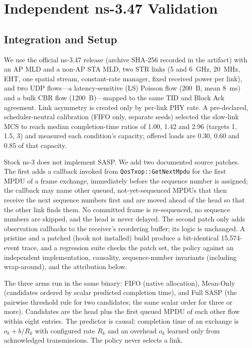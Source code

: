 \documentclass[10pt,journal,compsoc]{IEEEtran}
\begin{document}
\section{Independent ns-3.47 Validation}
\label{sec:ns3}

\subsection{Integration and Setup}
We use the official ns-3.47 release (archive SHA-256 recorded in the artifact) with an AP MLD and a non-AP STA MLD, two STR links (5 and 6~GHz, 20~MHz, EHT, one spatial stream, constant-rate manager, fixed received power per link), and two UDP flows---a latency-sensitive (LS) Poisson flow (200~B, mean 8~ms) and a bulk CBR flow (1200~B)---mapped to the same TID and Block Ack agreement. Link asymmetry is created only by per-link PHY rate. A pre-declared, scheduler-neutral calibration (FIFO only, separate seeds) selected the slow-link MCS to reach median completion-time ratios of 1.00, 1.42 and 2.96 (targets 1, 1.5, 3) and measured each condition's capacity; offered loads are 0.30, 0.60 and 0.85 of that capacity.

Stock ns-3 does not implement SASP. We add two documented source patches. The first adds a callback invoked from \texttt{QosTxop::GetNextMpdu} for the first MPDU of a frame exchange, immediately before the sequence number is assigned; the callback may name other queued, not-yet-sequenced MPDUs that then receive the next sequence numbers first and are moved ahead of the head so that the other link finds them. No committed frame is re-sequenced, no sequence numbers are skipped, and the head is never delayed. The second patch only adds observation callbacks to the receiver's reordering buffer; its logic is unchanged. A pristine and a patched (hook not installed) build produce a bit-identical 15{,}574-event trace, and a regression suite checks the patch set, the policy against an independent implementation, causality, sequence-number invariants (including wrap-around), and the attribution below.

The three arms run in the same binary: FIFO (native allocation), Mean-Only (candidates ordered by scalar predicted completion time), and Full SASP (the pairwise threshold rule for two candidates; the same scalar order for three or more). Candidates are the head plus the first queued MPDU of each other flow within eight entries. The predictor is causal: completion time of an exchange is $o_k + b/R_k$ with configured rate $R_k$ and an overhead $o_k$ learned only from acknowledged transmissions. The policy never selects a link.
\end{document}
